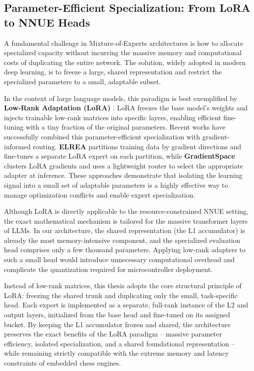 \subsection{Parameter-Efficient Specialization: From LoRA to NNUE Heads}
A fundamental challenge in Mixture-of-Experts architectures is how to allocate specialized capacity without incurring the massive memory and computational costs of duplicating the entire network. The solution, widely adopted in modern deep learning, is to freeze a large, shared representation and restrict the specialized parameters to a small, adaptable subset.

In the context of large language models, this paradigm is best exemplified by \textbf{Low-Rank Adaptation (LoRA)} \parencite{hu2021}. LoRA freezes the base model's weights and injects trainable low-rank matrices into specific layers, enabling efficient fine-tuning with a tiny fraction of the original parameters. Recent works have successfully combined this parameter-efficient specialization with gradient-informed routing. \textbf{ELREA} \parencite{li2025} partitions training data by gradient directions and fine-tunes a separate LoRA expert on each partition, while \textbf{GradientSpace} \parencite{sridharan2025} clusters LoRA gradients and uses a lightweight router to select the appropriate adapter at inference. These approaches demonstrate that isolating the learning signal into a small set of adaptable parameters is a highly effective way to manage optimization conflicts and enable expert specialization.

Although LoRA is directly applicable to the resource-constrained NNUE setting, the exact mathematical mechanism is tailored for the massive transformer layers of LLMs. In our architecture, the shared representation (the L1 accumulator) is already the most memory-intensive component, and the specialized evaluation head comprises only a few thousand parameters. Applying low-rank adapters to such a small head would introduce unnecessary computational overhead and complicate the quantization required for microcontroller deployment.

Instead of low-rank matrices, this thesis adopts the core structural principle of LoRA: freezing the shared trunk and duplicating only the small, task-specific head. Each expert is implemented as a separate, full-rank instance of the L2 and output layers, initialized from the base head and fine-tuned on its assigned bucket. By keeping the L1 accumulator frozen and shared, the architecture preserves the exact benefits of the LoRA paradigm -- massive parameter efficiency, isolated specialization, and a shared foundational representation -- while remaining strictly compatible with the extreme memory and latency constraints of embedded chess engines.

